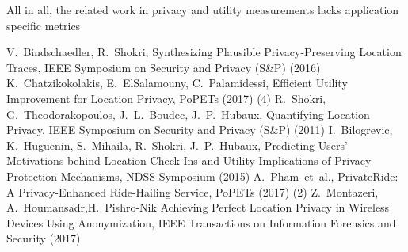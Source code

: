 \documentclass[USenglish,oneside,twocolumn]{article}
\begin{document}
All in all, the related work in privacy and utility measurements lacks application specific metrics 







\begin{thebibliography}{99}
 V.~Bindschaedler, R.~Shokri, Synthesizing Plausible Privacy-Preserving Location Traces, IEEE Symposium on Security and Privacy (S\&P) (2016)
K.~Chatzikokolakis, E.~ElSalamouny, C.~Palamidessi, Efficient Utility Improvement for Location Privacy, PoPETs (2017) (4)
R.~Shokri, G.~Theodorakopoulos, J.~L.~Boudec, J.~P.~Hubaux, Quantifying Location Privacy, IEEE Symposium on Security and Privacy (S\&P) (2011)
I.~Bilogrevic, K.~Huguenin, S.~Mihaila, R.~Shokri, J.~P.~Hubaux, Predicting Users’ Motivations behind Location Check-Ins and Utility Implications of Privacy Protection Mechanisms, NDSS Symposium (2015)
A.~Pham~et~al., PrivateRide: A Privacy-Enhanced Ride-Hailing Service, PoPETs (2017) (2)
 Z.~Montazeri, A.~Houmansadr,H.~Pishro-Nik Achieving Perfect Location Privacy in Wireless Devices Using Anonymization, IEEE Transactions on Information Forensics and Security (2017)
\end{thebibliography}
\end{document}
